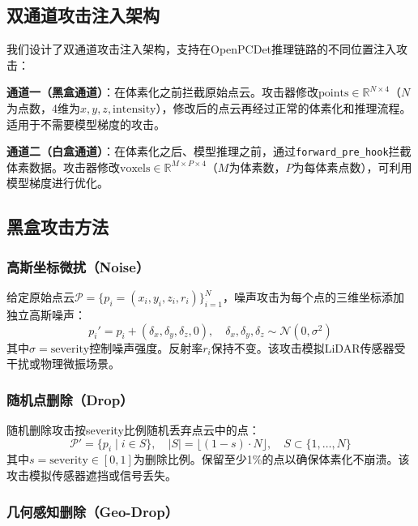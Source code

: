 ﻿\documentclass[12pt,a4paper]{ctexart}
\newcommand{\R}{\mathbb{R}}
\begin{document}
\subsection{双通道攻击注入架构}

我们设计了双通道攻击注入架构，支持在OpenPCDet推理链路的不同位置注入攻击：

\textbf{通道一（黑盒通道）}：在体素化之前拦截原始点云。攻击器修改$\text{points} \in \R^{N \times 4}$（$N$为点数，4维为$x,y,z,\text{intensity}$），修改后的点云再经过正常的体素化和推理流程。适用于不需要模型梯度的攻击。

\textbf{通道二（白盒通道）}：在体素化之后、模型推理之前，通过\texttt{forward\_pre\_hook}拦截体素数据。攻击器修改$\text{voxels} \in \R^{M \times P \times 4}$（$M$为体素数，$P$为每体素点数），可利用模型梯度进行优化。

\subsection{黑盒攻击方法}

\subsubsection{高斯坐标微扰（Noise）}

给定原始点云$\mathcal{P} = \{p_i = (x_i, y_i, z_i, r_i)\}_{i=1}^{N}$，噪声攻击为每个点的三维坐标添加独立高斯噪声：
\begin{equation}
  p_i' = p_i + (\delta_x, \delta_y, \delta_z, 0), \quad \delta_x, \delta_y, \delta_z \sim \mathcal{N}(0, \sigma^2)
  \label{eq:noise}
\end{equation}
其中$\sigma = \text{severity}$控制噪声强度。反射率$r_i$保持不变。该攻击模拟LiDAR传感器受干扰或物理微振场景。

\subsubsection{随机点删除（Drop）}

随机删除攻击按severity比例随机丢弃点云中的点：
\begin{equation}
  \mathcal{P}' = \{p_i \mid i \in S\}, \quad |S| = \lfloor(1 - s) \cdot N\rfloor, \quad S \subset \{1,\ldots,N\}
  \label{eq:drop}
\end{equation}
其中$s = \text{severity} \in [0, 1]$为删除比例。保留至少1\%的点以确保体素化不崩溃。该攻击模拟传感器遮挡或信号丢失。

\subsubsection{几何感知删除（Geo-Drop）}
\end{document}
